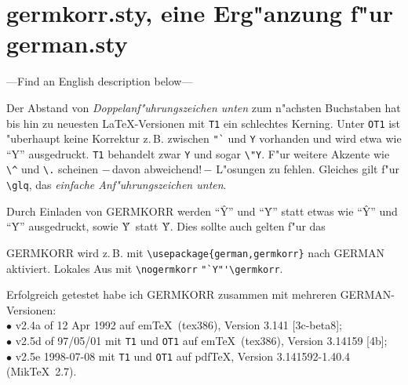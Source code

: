 \documentclass[12pt,a4paper]{article} \usepackage{german,germkorr}
\begin{document}
\section*{germkorr.sty, eine Erg"anzung f"ur german.sty}

\originalTeX---Find an English description below---\germanTeX

\vspace{0.2cm}\noindent Der Abstand von {\it Doppelanf"uhrungszeichen
unten\/} zum n"achsten Buchstaben hat bis hin zu neuesten \LaTeX-Versionen
mit \verb|T1| ein schlechtes Kerning. Unter \verb|OT1| ist "uberhaupt keine 
Korrektur z.\,B. zwischen \verb|"`| und \verb|Y| vorhanden und wird etwa wie
"`{}Y"' ausgedruckt. \verb|T1| behandelt zwar \verb|Y| und sogar \verb|\"Y|.
F"ur weitere Akzente wie \verb|\^| und \verb|\.| scheinen $-$\,davon
abweichend!\,$-$ L"osungen zu fehlen. Gleiches gilt f"ur \verb|\glq|, das
{\it einfache Anf"uhrungszeichen unten}.

Durch Einladen von GERMKORR werden "`\^Y"' und "`\.Y"' statt etwas wie
"`{}\^Y"' und "`{}\.Y"' ausgedruckt, sowie \glq\H{Y}\grq\ statt
\glq{}\H{Y}\grq. Dies sollte auch gelten f"ur das

\vspace{-0.3cm}
\tableofcontents
{}

\vspace{0.5cm}\noindent GERMKORR wird z.\,B. mit 
\verb|\usepackage{german,germkorr}| nach GERMAN aktiviert.
Lokales Aus mit \verb|\nogermkorr| \verb|"`Y"'|\verb|\germkorr|.

\vfill{\footnotesize\noindent Erfolgreich getestet habe ich GERMKORR
zusammen mit mehreren GERMAN-Versionen: 
\\ $\bullet$ v2.4a of 12 Apr 1992 auf em\TeX\ (tex386), Version 3.141
[3c-beta8];
\\ $\bullet$ v2.5d of 97/05/01 mit \verb|T1| und \verb|OT1| auf em\TeX\ 
(tex386), Version 3.14159 [4b];
\\ $\bullet$ v2.5e 1998-07-08 mit \verb|T1| und \verb|OT1| auf
pdf\TeX, Version 3.141592-1.40.4 (Mik\TeX~2.7).
}

\sloppy 
\end{document}
